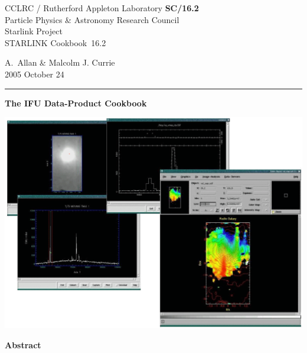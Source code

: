 \documentclass[twoside,11pt]{article}
\newcommand{\stardoccategory}  {STARLINK Cookbook}
\newcommand{\stardocinitials}  {SC}
\newcommand{\stardocnumber}    {16.2}
\newcommand{\stardocauthors}   {A.~Allan \& Malcolm J. Currie}
\newcommand{\stardocdate}      {2005 October 24}
\newcommand{\stardoctitle}     {The IFU Data-Product Cookbook}
\newcommand{\stardocname}{\stardocinitials /\stardocnumber}
\newenvironment{latexonly}{}{}
\begin{document}
\thispagestyle{empty}

\begin{latexonly}
   CCLRC / {\sc Rutherford Appleton Laboratory} \hfill {\bf \stardocname}\\
   {\large Particle Physics \& Astronomy Research Council}\\
   {\large Starlink Project\\}
   {\large \stardoccategory\ \stardocnumber}
   \begin{flushright}
   \stardocauthors\\
   \stardocdate
   \end{flushright}
   \vspace{-4mm}
   \rule{\textwidth}{0.5mm}
   \vspace{5mm}
   \begin{center}
   {\Huge\bf  \stardoctitle \\ [2.5ex]}
   \end{center}
   \vspace{5mm}

   \begin{center}
   \includegraphics[scale=0.6]{sc16_cover.eps}
   \end{center}

   \vspace{5mm}
   \begin{center}
      {\Large\bf Abstract}
   \end{center}
\end{latexonly}
\end{document}
